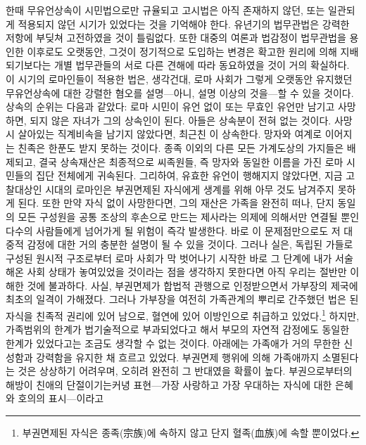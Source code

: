 한때 무유언상속이 시민법으로만 규율되고
고시법은 아직 존재하지 않던, 또는 일관되게 적용되지 않던
시기가 있었다는 것을 기억해야 한다.
유년기의 법무관법은 강력한 저항에 부딪쳐 고전하였을 것이 틀림없다.
또한
대중의 여론과 법감정이 법무관법을 용인한 이후로도 오랫동안,
그것이 정기적으로 도입하는 변경은
확고한 원리에 의해 지배되기보다는
개별 법무관들의 서로 다른 견해에 따라 동요하였을 것이 거의 확실하다.
이 시기의 로마인들이 적용한 법은, 생각건대,
로마 사회가 그렇게 오랫동안 유지했던 무유언상속에 대한 강렬한 혐오를
설명---아니, 설명 이상의 것을---할 수 있을 것이다.
상속의 순위는 다음과 같았다:
로마 시민이 유언 없이 또는 무효인 유언만 남기고 사망하면,
되지 않은 자녀가 그의 상속인이 된다.
 아들은 상속분이 전혀 없는 것이다.
사망시 살아있는 직계비속을 남기지 않았다면,
최근친 이 상속한다.
망자와  여계로 이어지는 친족은
한푼도 받지 못하는 것이다.
종족 이외의 다른 모든 가계도상의 가지\hanja{[枝]}들은 배제되고,
결국 상속재산은 최종적으로 씨족원들, 즉
망자와 동일한 이름을 가진 로마 시민들의 집단 전체에게 귀속된다.
그리하여, 유효한 유언이 행해지지 않았다면,
지금 고찰대상인 시대의 로마인은 부권면제된 자식에게 생계를 위해
아무 것도 남겨주지 못하게 된다.
또한 만약 자식 없이 사망한다면,
그의 재산은 가족을 완전히 떠나, 단지
동일 의 모든 구성원을 공통 조상의 후손으로 만드는
제사라는 의제에 의해서만 연결될 뿐인
다수의 사람들에게 넘어가게 될 위험이 즉각 발생한다.
바로 이 문제점만으로도 저 대중적 감정에 대한 거의 충분한 설명이
될 수 있을 것이다.
그러나 실은,
독립된 가들로 구성된 원시적 구조로부터
로마 사회가 막 벗어나기 시작한 바로 그 단계에
내가 서술해온 사회 상태가
놓여있었을 것이라는 점을
생각하지 못한다면
아직 우리는 절반만 이해한 것에 불과하다.
사실,
부권면제가 합법적 관행으로 인정받으면서
가부장의 제국에
최초의 일격이 가해졌다.
그러나 가부장을 여전히 가족관계의 뿌리로 간주했던 법은
된 자식을 친족적 권리에 있어 남으로,
혈연에 있어 이방인으로 취급하고 있었다.\footnote{부권면제된 자식은
  종족(宗族)에 속하지 않고 단지 혈족(血族)에 속할 뿐이었다.}
하지만, 가족범위의 한계가 법기술적으로 부과되었다고 해서
부모의 자연적 감정에도 동일한 한계가 있었다고는 조금도 생각할 수 없는 것이다.
 아래에는
가족애가 거의 무한한 신성함과 강력함을 유지한 채
흐르고 있었다.
부권면제 행위에 의해 가족애까지 소멸된다는 것은
상상하기 어려우며, 오히려 완전히 그 반대였을 확률이 높다.
부권으로부터의 해방이 친애의 단절이기는커녕
표현---가장 사랑하고 가장 우대하는 자식에 대한 은혜와 호의의 표시---이라고
